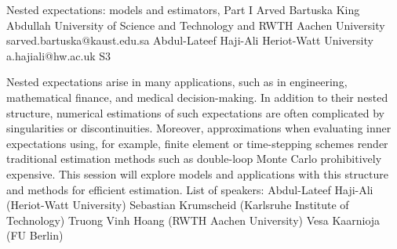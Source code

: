 

\clearpage

\begin{session}
 {Nested expectations: models and estimators, Part I}%
 {Arved Bartuska}%
 {King Abdullah University of Science and Technology and RWTH Aachen University}%
 {sarved.bartuska@kaust.edu.sa}%
 {Abdul-Lateef Haji-Ali}%
 {Heriot-Watt University}%
 {a.hajiali@hw.ac.uk}%
 {S3}%
{}

 Nested expectations
 arise in many applications, such as in engineering, mathematical finance, and medical decision-making. In addition to their nested structure, numerical estimations of such expectations are often complicated by singularities or discontinuities. Moreover, approximations when evaluating inner expectations using, for example, finite element or time-stepping schemes render traditional estimation methods such as double-loop Monte Carlo prohibitively expensive. This session will explore models and applications with this structure and methods for efficient estimation.
 List of speakers:
 Abdul-Lateef Haji-Ali (Heriot-Watt University)
 Sebastian Krumscheid (Karlsruhe Institute of Technology)
 Truong Vinh Hoang (RWTH Aachen University)
 Vesa Kaarnioja (FU Berlin)
\end{session}



\clearpage

